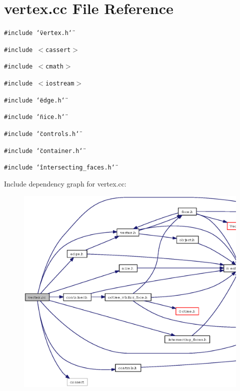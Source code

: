 \section{vertex.cc File Reference}
\label{vertex_8cc}
{\tt \#include \char`\"{}vertex.h\char`\"{}}\par
{\tt \#include $<$cassert$>$}\par
{\tt \#include $<$cmath$>$}\par
{\tt \#include $<$iostream$>$}\par
{\tt \#include \char`\"{}edge.h\char`\"{}}\par
{\tt \#include \char`\"{}nice.h\char`\"{}}\par
{\tt \#include \char`\"{}controls.h\char`\"{}}\par
{\tt \#include \char`\"{}container.h\char`\"{}}\par
{\tt \#include \char`\"{}intersecting\_\-faces.h\char`\"{}}\par


Include dependency graph for vertex.cc:\begin{figure}[H]
\begin{center}
\leavevmode
\includegraphics[width=389pt]{vertex_8cc__incl}
\end{center}
\end{figure}
